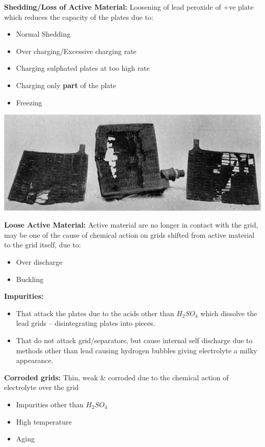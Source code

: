 \documentclass{beamer}
\begin{document}
\begin{frame}     %
  \fontsize{8pt}{14}\selectfont
  
  \textbf{Shedding/Loss of Active Material:} Loosening of lead peroxide of +ve plate which reduces the capacity of the plates due to:
  \begin{itemize}
    \item Normal Shedding
    \item Over charging/Excessive charging rate
    \item Charging sulphated plates at too high rate
    \item Charging only \textbf{part} of the plate
    \item Freezing
  \end{itemize}
  
  \begin{center}
    \includegraphics[width=0.8\linewidth]{./Resources/Images/shedding.jpg}
  \end{center}
\end{frame}

\begin{frame}     %
  \fontsize{8pt}{14}\selectfont
  
  \textbf{Loose Active Material:} Active material are no longer in contact with the grid, may be one of the cause of chemical action
  on grids shifted from active material to the grid itself, due to:
  \begin{itemize}
    \item Over discharge
    \item Buckling
  \end{itemize}

  \textbf{Impurities:} 
  \begin{itemize}
    \item That attack the plates due to the acids other than $H_{2}SO_{4}$ which dissolve the lead grids -- disintegrating plates into pieces.
    \item That do not attack grid/separators, but cause internal self discharge due to methods other than lead causing hydrogen bubbles 
    giving electrolyte a milky appearance.
  \end{itemize}  
  
  \textbf{Corroded grids:} Thin, weak \& corroded due to the chemical action of electrolyte over the grid
  \begin{itemize}
    \item Impurities other than $H_{2}SO_{4}$
    \item High temperature
    \item Aging
  \end{itemize}
\end{frame}
\end{document}
